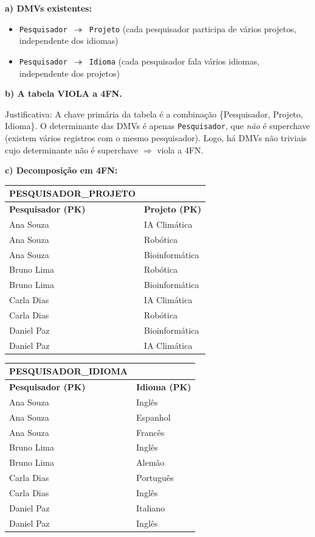 \documentclass[12pt]{article}
\begin{document}
\begin{respdisc}
\textbf{a) DMVs existentes:}
\begin{itemize}
  \item \texttt{Pesquisador $\twoheadrightarrow$ Projeto} (cada pesquisador participa de vários projetos, independente dos idiomas)
  \item \texttt{Pesquisador $\twoheadrightarrow$ Idioma} (cada pesquisador fala vários idiomas, independente dos projetos)
\end{itemize}

\medskip
\textbf{b) A tabela VIOLA a 4FN.}

Justificativa: A chave primária da tabela é a combinação \{Pesquisador, Projeto, Idioma\}. O determinante das DMVs é apenas \texttt{Pesquisador}, que \emph{não} é superchave (existem vários registros com o mesmo pesquisador). Logo, há DMVs não triviais cujo determinante não é superchave $\Rightarrow$ viola a 4FN.

\medskip
\textbf{c) Decomposição em 4FN:}

\smallskip
\begin{tabular}{|l|l|}
\hline
\textbf{PESQUISADOR\_PROJETO} & \\
\hline
\textbf{Pesquisador (PK)} & \textbf{Projeto (PK)} \\
\hline
Ana Souza  & IA Climática   \\
Ana Souza  & Robótica       \\
Ana Souza  & Bioinformática \\
Bruno Lima & Robótica       \\
Bruno Lima & Bioinformática \\
Carla Dias & IA Climática   \\
Carla Dias & Robótica       \\
Daniel Paz & Bioinformática \\
Daniel Paz & IA Climática   \\
\hline
\end{tabular}

\medskip
\begin{tabular}{|l|l|}
\hline
\textbf{PESQUISADOR\_IDIOMA} & \\
\hline
\textbf{Pesquisador (PK)} & \textbf{Idioma (PK)} \\
\hline
Ana Souza  & Inglês    \\
Ana Souza  & Espanhol  \\
Ana Souza  & Francês   \\
Bruno Lima & Inglês    \\
Bruno Lima & Alemão    \\
Carla Dias & Português \\
Carla Dias & Inglês    \\
Daniel Paz & Italiano  \\
Daniel Paz & Inglês    \\
\hline
\end{tabular}
\end{respdisc}
\end{document}
